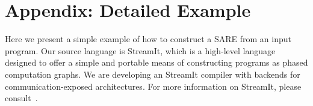 \section{Appendix: Detailed Example}
Here we present a simple example of how to construct a SARE from an
input program.  Our source language is StreamIt, which is a high-level
language designed to offer a simple and portable means of constructing
programs as phased computation graphs.  We are developing an StreamIt
compiler with backends for communication-exposed architectures.  For
more information on StreamIt, please
consult~\cite{streamitcc,Gordo02}.



